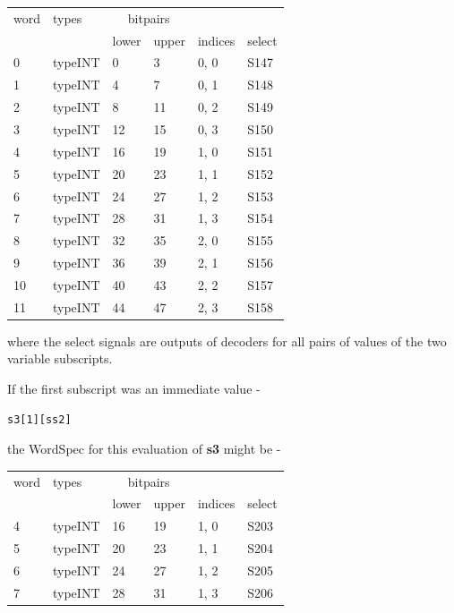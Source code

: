             \begin{tabular}{| l || l || l l | l | l |}
            \hline
            word  & types    & \multicolumn{2}{c|}{bitpairs} & & \\
                  &          & lower & upper & indices & select \\
            \hline \hline
             0    & typeINT  & 0     & 3     & 0, 0 & S147 \\ \hline
             1    & typeINT  & 4     & 7     & 0, 1 & S148 \\ \hline
             2    & typeINT  & 8     & 11    & 0, 2 & S149 \\ \hline
             3    & typeINT  & 12    & 15    & 0, 3 & S150 \\ \hline
             4    & typeINT  & 16    & 19    & 1, 0 & S151 \\ \hline
             5    & typeINT  & 20    & 23    & 1, 1 & S152 \\ \hline
             6    & typeINT  & 24    & 27    & 1, 2 & S153 \\ \hline
             7    & typeINT  & 28    & 31    & 1, 3 & S154 \\ \hline
             8    & typeINT  & 32    & 35    & 2, 0 & S155 \\ \hline
             9    & typeINT  & 36    & 39    & 2, 1 & S156 \\ \hline
            10    & typeINT  & 40    & 43    & 2, 2 & S157 \\ \hline
            11    & typeINT  & 44    & 47    & 2, 3 & S158 \\ \hline
            \end{tabular}

            where the select signals are outputs of decoders for all
            pairs of values of the two variable subscripts.

            If the first subscript was an immediate value -
            \begin{lstlisting}[gobble=12, language=threepl]
                s3[1][ss2]
            \end{lstlisting}
            the WordSpec for this evaluation of {\bf s3} might be -

            \begin{tabular}{| l || l || l l  |l | l |}
            \hline
            word  & types    & \multicolumn{2}{c|}{bitpairs} & & \\
                  &          & lower & upper & indices & select \\
            \hline \hline
             4    & typeINT  & 16    & 19    & 1, 0 & S203 \\ \hline
             5    & typeINT  & 20    & 23    & 1, 1 & S204 \\ \hline
             6    & typeINT  & 24    & 27    & 1, 2 & S205 \\ \hline
             7    & typeINT  & 28    & 31    & 1, 3 & S206 \\ \hline
            \end{tabular}

